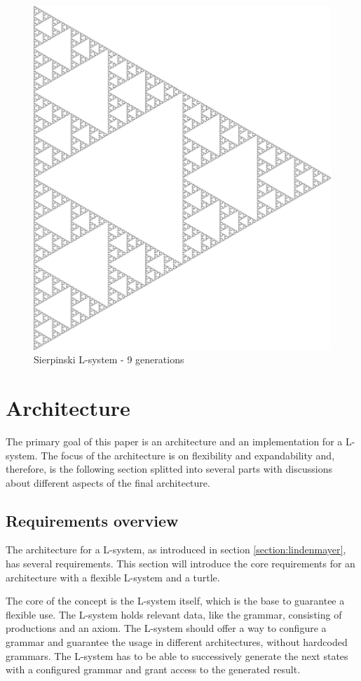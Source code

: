 \documentclass[english]{cpp-hmwk}
\begin{document}
\begin{figure}[h!]
	\centering
	\includegraphics[width=0.6\columnwidth]{../graphs/sierpinski.png}
	\caption{Sierpinski L-system - 9 generations}
	\label{figure:Sierpinski}
\end{figure}
 
\clearpage
\section{Architecture}
The primary goal of this paper is an architecture and an implementation for a L-system. The focus of the architecture is on flexibility and expandability and, therefore, is the following section splitted into several parts with discussions about different aspects of the final architecture.

\subsection{Requirements overview}
The architecture for a L-system, as introduced in section \ref{section:lindenmayer}, has several requirements. This section will introduce the core requirements for an architecture with a flexible L-system and a turtle.

\medskip
\noindent The core of the concept is the L-system itself, which is the base to guarantee a flexible use. The L-system holds relevant data, like the grammar, consisting of productions and an axiom. The L-system should offer a way to configure a grammar and guarantee the usage in different architectures, without hardcoded grammars. The L-system has to be able to successively generate the next states with a configured grammar and grant access to the generated result.
\end{document}
